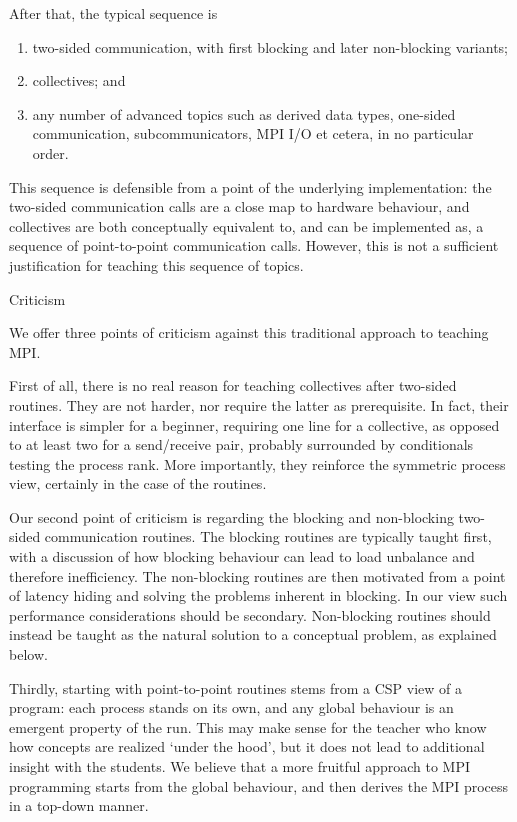 After that, the typical sequence is
\begin{enumerate}
\item two-sided communication, with first blocking and later non-blocking variants;
\item collectives; and 
\item any number of advanced topics such as derived data types,
  one-sided communication, subcommunicators,
  MPI I/O et cetera, in no particular order.
\end{enumerate}
This sequence is defensible from a point of the underlying implementation:
the two-sided communication calls are a close map to hardware behaviour,
and collectives are both conceptually equivalent to, and
can be implemented as, a sequence of point-to-point communication calls.
However, this is not a sufficient justification for
teaching this sequence of topics.

 {Criticism}

We offer three points of criticism against this traditional approach to teaching MPI.

First of all, there is
no real reason for teaching collectives after two-sided routines. They
are not harder, nor require the latter as prerequisite. In fact, their
interface is simpler for a beginner, requiring one line for a collective, as
opposed to at least two for a send/receive pair, probably surrounded
by conditionals testing the process rank. More importantly, they
reinforce the symmetric process view, certainly in the case of the
 routines.

Our second point of criticism is regarding the blocking and
non-blocking two-sided communication routines.
%
The blocking routines are typically taught
first, with a discussion of how blocking behaviour can lead to load
unbalance and therefore inefficiency. The non-blocking routines are
then motivated from a point of latency hiding and solving the problems
inherent in blocking. In our view such performance considerations
should be secondary.
Non-blocking routines should instead be taught as the natural solution to a
conceptual problem, as explained below.

Thirdly, starting with point-to-point routines stems from a
\ac{CSP}\cite{Hoare:CSP} view of a program:
each process stands on its own, and any global behaviour is an emergent
property of the run. This may make sense for the teacher who know
how concepts are realized `under the hood', but it does not lead
to additional insight with the students.
We believe that a more fruitful approach to MPI
programming starts from the global behaviour, and then derives the MPI
process in a top-down manner.

